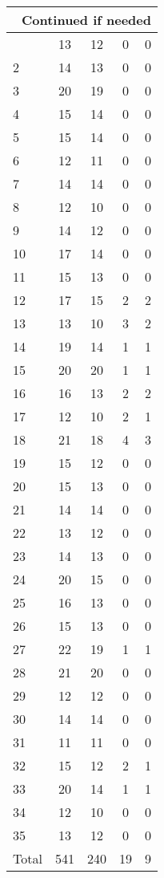 \begin{center}
\begin{longtable}{l|c|c|c|c}
\hline \multicolumn{5}{|r|}{{Continued if needed}} \\ \hline
\endfoot 
1 & 13 & 12 & 0 & 0\\ \hline
2 & 14 & 13 & 0 & 0\\ \hline
3 & 20 & 19 & 0 & 0\\ \hline
4 & 15 & 14 & 0 & 0\\ \hline
5 & 15 & 14 & 0 & 0\\ \hline
6 & 12 & 11 & 0 & 0\\ \hline
7 & 14 & 14 & 0 & 0\\ \hline
8 & 12 & 10 & 0 & 0\\ \hline
9 & 14 & 12 & 0 & 0\\ \hline
10 & 17 & 14 & 0 & 0\\ \hline
11 & 15 & 13 & 0 & 0\\ \hline
12 & 17 & 15 & 2 & 2\\ \hline
13 & 13 & 10 & 3 & 2\\ \hline
14 & 19 & 14 & 1 & 1\\ \hline
15 & 20 & 20 & 1 & 1\\ \hline
16 & 16 & 13 & 2 & 2\\ \hline
17 & 12 & 10 & 2 & 1\\ \hline
18 & 21 & 18 & 4 & 3\\ \hline
19 & 15 & 12 & 0 & 0\\ \hline
20 & 15 & 13 & 0 & 0\\ \hline
21 & 14 & 14 & 0 & 0\\ \hline
22 & 13 & 12 & 0 & 0\\ \hline
23 & 14 & 13 & 0 & 0\\ \hline
24 & 20 & 15 & 0 & 0\\ \hline
25 & 16 & 13 & 0 & 0\\ \hline
26 & 15 & 13 & 0 & 0\\ \hline
27 & 22 & 19 & 1 & 1\\ \hline
28 & 21 & 20 & 0 & 0\\ \hline
29 & 12 & 12 & 0 & 0\\ \hline
30 & 14 & 14 & 0 & 0\\ \hline
31 & 11 & 11 & 0 & 0\\ \hline
32 & 15 & 12 & 2 & 1\\ \hline
33 & 20 & 14 & 1 & 1\\ \hline
34 & 12 & 10 & 0 & 0\\ \hline
35 & 13 & 12 & 0 & 0\\ \hline
\hline \hline
Total & 541 & 240 & 19 & 9




\end{longtable}
\end{center}

